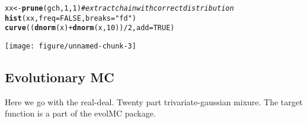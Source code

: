 \documentclass{article}\usepackage[]{graphicx}\usepackage[]{color}
\makeatletter
\def\maxwidth{ %
  \ifdim\Gin@nat@width>\linewidth
    \linewidth
  \else
    \Gin@nat@width
  \fi
}
\newcommand{\hlnum}[1]{\textcolor[rgb]{0.686,0.059,0.569}{#1}}%
\newcommand{\hlstr}[1]{\textcolor[rgb]{0.192,0.494,0.8}{#1}}%
\newcommand{\hlcom}[1]{\textcolor[rgb]{0.678,0.584,0.686}{\textit{#1}}}%
\newcommand{\hlopt}[1]{\textcolor[rgb]{0,0,0}{#1}}%
\newcommand{\hlstd}[1]{\textcolor[rgb]{0.345,0.345,0.345}{#1}}%
\newcommand{\hlkwb}[1]{\textcolor[rgb]{0.69,0.353,0.396}{#1}}%
\newcommand{\hlkwc}[1]{\textcolor[rgb]{0.333,0.667,0.333}{#1}}%
\newcommand{\hlkwd}[1]{\textcolor[rgb]{0.737,0.353,0.396}{\textbf{#1}}}%
\newenvironment{kframe}{%
 \def\at@end@of@kframe{}%
 \ifinner\ifhmode%
  \def\at@end@of@kframe{\end{minipage}}%
  \begin{minipage}{\columnwidth}%
 \fi\fi%
 \def\FrameCommand##1{\hskip\@totalleftmargin \hskip-\fboxsep
 \colorbox{shadecolor}{##1}\hskip-\fboxsep
     \hskip-\linewidth \hskip-\@totalleftmargin \hskip\columnwidth}%
 \MakeFramed {\advance\hsize-\width
   \@totalleftmargin\z@ \linewidth\hsize
   \@setminipage}}%
 {\par\unskip\endMakeFramed%
 \at@end@of@kframe}
\newenvironment{knitrout}{}{} %
\makeatother
\begin{document}
\begin{knitrout}
\color{fgcolor}\begin{kframe}
\begin{alltt}
\hlstd{xx} \hlkwb{<-} \hlkwd{prune}\hlstd{(gch,} \hlnum{1}\hlstd{,} \hlnum{1}\hlstd{)}  \hlcom{#extract chain with correct distribution}
\hlkwd{hist}\hlstd{(xx,} \hlkwc{freq} \hlstd{=} \hlnum{FALSE}\hlstd{,} \hlkwc{breaks} \hlstd{=} \hlstr{"fd"}\hlstd{)}
\hlkwd{curve}\hlstd{((}\hlkwd{dnorm}\hlstd{(x)} \hlopt{+} \hlkwd{dnorm}\hlstd{(x,} \hlnum{10}\hlstd{))}\hlopt{/}\hlnum{2}\hlstd{,} \hlkwc{add} \hlstd{=} \hlnum{TRUE}\hlstd{)}
\end{alltt}
\end{kframe}

{\centering \texttt{[image: figure/unnamed-chunk-3]} 

}



\end{knitrout}


\subsection{Evolutionary MC}

Here we go with the real-deal. Twenty part trivariate-gaussian mixure.
The target function is a part of the evolMC package. 
\end{document}

